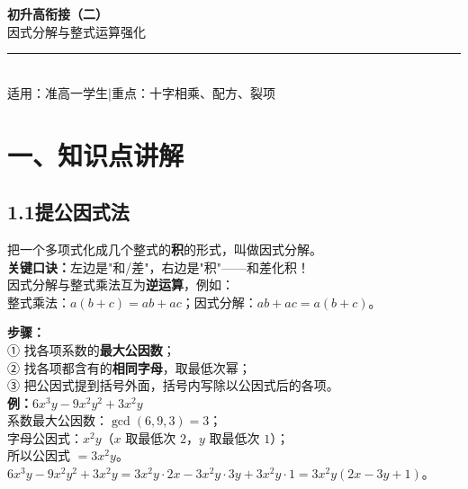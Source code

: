 \documentclass[12pt, a4paper]{ctexart}
\begin{document}
\begin{center}
{\Huge\bfseries\textcolor{mainblue}{初升高衔接（二）}}\\[12pt]
{\LARGE\textcolor{mainblue}{因式分解与整式运算强化}}\\[10pt]
\rule{0.6\textwidth}{1pt}\\[8pt]
{\normalsize 适用：准高一学生\quad |\quad 重点：十字相乘、配方、裂项}
\end{center}
\vspace{6pt}

\section*{\textcolor{mainblue}{一、知识点讲解}}

\subsection*{1.1\quad 提公因式法}

\begin{knowledgebox}
把一个多项式化成几个整式的\textbf{积}的形式，叫做因式分解。\\[4pt]
\textbf{关键口诀：}左边是"和/差"，右边是"积"——和差化积！\\[4pt]
因式分解与整式乘法互为\textbf{逆运算}，例如：\\
整式乘法：$a(b+c)=ab+ac$；\quad 因式分解：$ab+ac=a(b+c)$。
\end{knowledgebox}

\begin{knowledgebox}
\textbf{步骤：}\\[3pt]
① 找各项系数的\textbf{最大公因数}；\\
② 找各项都含有的\textbf{相同字母}，取最低次幂；\\
③ 把公因式提到括号外面，括号内写除以公因式后的各项。\\[6pt]
\textbf{例：}\quad $6x^3y - 9x^2y^2 + 3x^2y$\\[3pt]
系数最大公因数：$\gcd(6,9,3)=3$；\\
字母公因式：$x^2y$（$x$ 取最低次 $2$，$y$ 取最低次 $1$）；\\
所以公因式 $= 3x^2y$。\\[3pt]
$6x^3y - 9x^2y^2 + 3x^2y = 3x^2y \cdot 2x - 3x^2y \cdot 3y + 3x^2y \cdot 1 = 3x^2y(2x - 3y + 1)$。
\end{knowledgebox}
\end{document}

